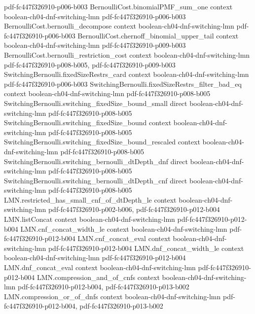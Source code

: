 \begin{theorem}
  {pdf-fc447f326910-p006-b003}
\proofstep
  {BernoulliCost.binomialPMF_sum_one}
  {context}
  {boolean-ch04-dnf-switching-lmn}
  {pdf-fc447f326910-p006-b003}
\proofstep
  {BernoulliCost.bernoulli_decompose}
  {context}
  {boolean-ch04-dnf-switching-lmn}
  {pdf-fc447f326910-p006-b003}
\proofstep
  {BernoulliCost.chernoff_binomial_upper_tail}
  {context}
  {boolean-ch04-dnf-switching-lmn}
  {pdf-fc447f326910-p009-b003}
\proofstep
  {BernoulliCost.bernoulli_restriction_cost}
  {context}
  {boolean-ch04-dnf-switching-lmn}
  {pdf-fc447f326910-p008-b005,
    pdf-fc447f326910-p009-b003}
\proofstep
  {SwitchingBernoulli.fixedSizeRestrs_card}
  {context}
  {boolean-ch04-dnf-switching-lmn}
  {pdf-fc447f326910-p006-b003}
\proofstep
  {SwitchingBernoulli.fixedSizeRestrs_filter_bad_eq}
  {context}
  {boolean-ch04-dnf-switching-lmn}
  {pdf-fc447f326910-p008-b005}
\proofstep
  {SwitchingBernoulli.switching_fixedSize_bound_small}
  {direct}
  {boolean-ch04-dnf-switching-lmn}
  {pdf-fc447f326910-p008-b005}
\proofstep
  {SwitchingBernoulli.switching_fixedSize_bound}
  {context}
  {boolean-ch04-dnf-switching-lmn}
  {pdf-fc447f326910-p008-b005}
\proofstep
  {SwitchingBernoulli.switching_fixedSize_bound_rescaled}
  {context}
  {boolean-ch04-dnf-switching-lmn}
  {pdf-fc447f326910-p008-b005}
\proofstep
  {SwitchingBernoulli.switching_bernoulli_dtDepth_dnf}
  {direct}
  {boolean-ch04-dnf-switching-lmn}
  {pdf-fc447f326910-p008-b005}
\proofstep
  {SwitchingBernoulli.switching_bernoulli_dtDepth_cnf}
  {direct}
  {boolean-ch04-dnf-switching-lmn}
  {pdf-fc447f326910-p008-b005}
\proofstep
  {LMN.restricted_has_small_cnf_of_dtDepth_le}
  {context}
  {boolean-ch04-dnf-switching-lmn}
  {pdf-fc447f326910-p002-b006,
    pdf-fc447f326910-p012-b004}
\proofstep
  {LMN.listConcat}
  {context}
  {boolean-ch04-dnf-switching-lmn}
  {pdf-fc447f326910-p012-b004}
\proofstep
  {LMN.cnf_concat_width_le}
  {context}
  {boolean-ch04-dnf-switching-lmn}
  {pdf-fc447f326910-p012-b004}
\proofstep
  {LMN.cnf_concat_eval}
  {context}
  {boolean-ch04-dnf-switching-lmn}
  {pdf-fc447f326910-p012-b004}
\proofstep
  {LMN.dnf_concat_width_le}
  {context}
  {boolean-ch04-dnf-switching-lmn}
  {pdf-fc447f326910-p012-b004}
\proofstep
  {LMN.dnf_concat_eval}
  {context}
  {boolean-ch04-dnf-switching-lmn}
  {pdf-fc447f326910-p012-b004}
\proofstep
  {LMN.compression_and_of_cnfs}
  {context}
  {boolean-ch04-dnf-switching-lmn}
  {pdf-fc447f326910-p012-b004,
    pdf-fc447f326910-p013-b002}
\proofstep
  {LMN.compression_or_of_dnfs}
  {context}
  {boolean-ch04-dnf-switching-lmn}
  {pdf-fc447f326910-p012-b004,
    pdf-fc447f326910-p013-b002}

\end{theorem}

